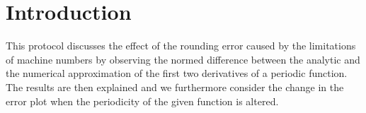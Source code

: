 \section{Introduction}

This protocol discusses the effect of the rounding error caused by the limitations of machine numbers by observing the normed difference between the analytic and the numerical approximation of the first two derivatives of a periodic function. The results are then explained and we furthermore consider the change in the error plot when the periodicity of the given function is altered.